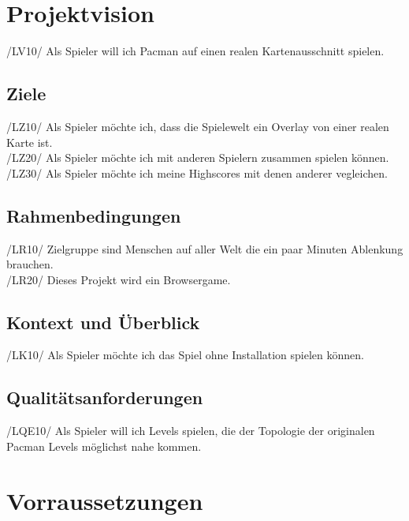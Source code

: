 \documentclass[11pt,a4paper]{article}
\begin{document}
\flushleft
\tableofcontents
\section{Projektvision}

/LV10/ Als Spieler will ich Pacman auf einen
realen Kartenausschnitt spielen.\\


\subsection{Ziele}

/LZ10/ Als Spieler möchte ich, dass die
Spielewelt ein Overlay von einer realen Karte
ist. \\
/LZ20/ Als Spieler möchte ich mit anderen
Spielern zusammen spielen können.\\
/LZ30/ Als Spieler möchte ich meine
Highscores mit denen anderer vegleichen.\\

\subsection{Rahmenbedingungen} 

/LR10/ Zielgruppe sind Menschen auf aller
Welt die ein paar Minuten Ablenkung
brauchen.\\
/LR20/ Dieses Projekt wird ein Browsergame.\\

\subsection{Kontext und Überblick}

/LK10/ Als Spieler möchte ich das Spiel ohne
Installation spielen können.\\

\subsection{Qualitätsanforderungen}

/LQE10/ Als Spieler will ich Levels spielen,
die der Topologie der originalen Pacman
Levels möglichst nahe kommen.\\

\section{Vorraussetzungen}
\end{document}
